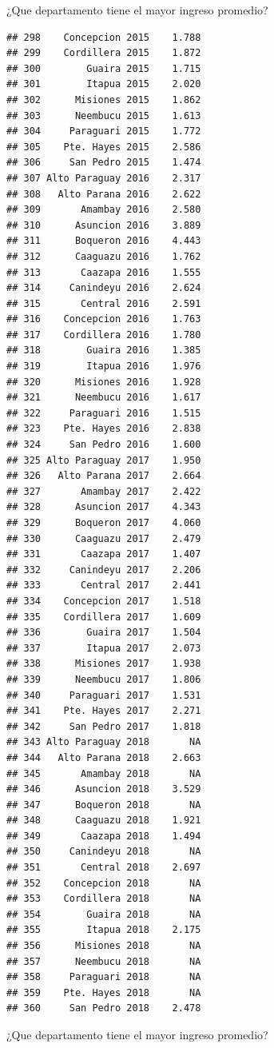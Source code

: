 \documentclass[
  ignorenonframetext,
]{beamer}
\newenvironment{Shaded}{\begin{snugshade}}{\end{snugshade}}
\newcommand{\CommentTok}[1]{\textcolor[rgb]{0.56,0.35,0.01}{\textit{#1}}}
\newcommand{\FunctionTok}[1]{\textcolor[rgb]{0.13,0.29,0.53}{\textbf{#1}}}
\newcommand{\NormalTok}[1]{#1}
\newcommand{\OtherTok}[1]{\textcolor[rgb]{0.56,0.35,0.01}{#1}}
\newcommand{\SpecialCharTok}[1]{\textcolor[rgb]{0.81,0.36,0.00}{\textbf{#1}}}
\begin{document}
\begin{frame}[fragile]{¿Que departamento tiene el mayor ingreso
promedio?}
\begin{verbatim}
## 298    Concepcion 2015    1.788
## 299    Cordillera 2015    1.872
## 300        Guaira 2015    1.715
## 301        Itapua 2015    2.020
## 302      Misiones 2015    1.862
## 303      Neembucu 2015    1.613
## 304     Paraguari 2015    1.772
## 305    Pte. Hayes 2015    2.586
## 306     San Pedro 2015    1.474
## 307 Alto Paraguay 2016    2.317
## 308   Alto Parana 2016    2.622
## 309       Amambay 2016    2.580
## 310      Asuncion 2016    3.889
## 311      Boqueron 2016    4.443
## 312      Caaguazu 2016    1.762
## 313       Caazapa 2016    1.555
## 314     Canindeyu 2016    2.624
## 315       Central 2016    2.591
## 316    Concepcion 2016    1.763
## 317    Cordillera 2016    1.780
## 318        Guaira 2016    1.385
## 319        Itapua 2016    1.976
## 320      Misiones 2016    1.928
## 321      Neembucu 2016    1.617
## 322     Paraguari 2016    1.515
## 323    Pte. Hayes 2016    2.838
## 324     San Pedro 2016    1.600
## 325 Alto Paraguay 2017    1.950
## 326   Alto Parana 2017    2.664
## 327       Amambay 2017    2.422
## 328      Asuncion 2017    4.343
## 329      Boqueron 2017    4.060
## 330      Caaguazu 2017    2.479
## 331       Caazapa 2017    1.407
## 332     Canindeyu 2017    2.206
## 333       Central 2017    2.441
## 334    Concepcion 2017    1.518
## 335    Cordillera 2017    1.609
## 336        Guaira 2017    1.504
## 337        Itapua 2017    2.073
## 338      Misiones 2017    1.938
## 339      Neembucu 2017    1.806
## 340     Paraguari 2017    1.531
## 341    Pte. Hayes 2017    2.271
## 342     San Pedro 2017    1.818
## 343 Alto Paraguay 2018       NA
## 344   Alto Parana 2018    2.663
## 345       Amambay 2018       NA
## 346      Asuncion 2018    3.529
## 347      Boqueron 2018       NA
## 348      Caaguazu 2018    1.921
## 349       Caazapa 2018    1.494
## 350     Canindeyu 2018       NA
## 351       Central 2018    2.697
## 352    Concepcion 2018       NA
## 353    Cordillera 2018       NA
## 354        Guaira 2018       NA
## 355        Itapua 2018    2.175
## 356      Misiones 2018       NA
## 357      Neembucu 2018       NA
## 358     Paraguari 2018       NA
## 359    Pte. Hayes 2018       NA
## 360     San Pedro 2018    2.478
\end{verbatim}

\begin{block}{¿Que departamento tiene el mayor ingreso promedio?}
\protect\hypertarget{que-departamento-tiene-el-mayor-ingreso-promedio-2}{}
\begin{Shaded}
\end{Shaded}
\end{block}
\end{frame}
\end{document}
